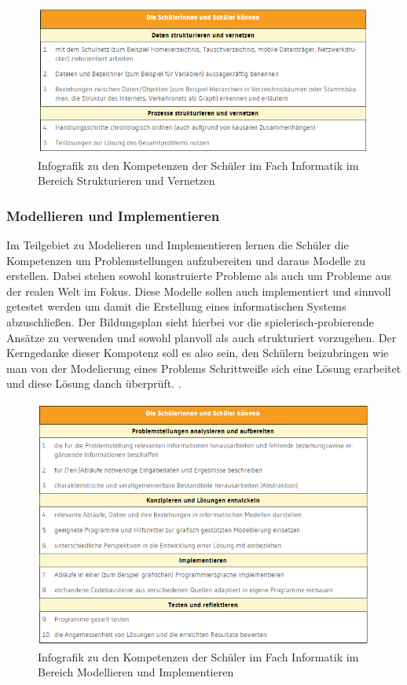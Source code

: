 \begin{figure}[H]
	\centering
	\includegraphics[width=\textwidth,height=\textheight,keepaspectratio]{images/struc.png}
	\caption{Infografik zu den Kompetenzen der Schüler im Fach Informatik im Bereich Strukturieren und Vernetzen}
	\label{Strukturieren und Vernetzen Infografik}
\end{figure}

\subsubsection{Modellieren und Implementieren}

Im Teilgebiet zu Modelieren und Implementieren lernen die Schüler die Kompetenzen um Problemstellungen aufzubereiten und daraus Modelle zu erstellen. Dabei stehen sowohl konstruierte Probleme als auch um Probleme aus der realen Welt im Fokus. Diese Modelle sollen auch implementiert und sinnvoll getestet werden um damit die Erstellung eines informatischen Systems abzuschließen. Der Bildungsplan sieht hierbei vor die spielerisch-probierende Ansätze zu verwenden und sowohl planvoll als auch strukturiert vorzugehen. Der Kerngedanke dieser Kompotenz soll es also sein, den Schülern beizubringen wie man von der Modelierung eines Problems Schrittweiße sich eine Lösung erarbeitet und diese Lösung danch überprüft. \cite{Model}.

\begin{figure}[H]
	\centering
	\includegraphics[width=\textwidth,height=\textheight,keepaspectratio]{images/model.png}
	\caption{Infografik zu den Kompetenzen der Schüler im Fach Informatik im Bereich Modellieren und Implementieren}
	\label{Modellieren und Implementieren Infografik}
\end{figure}

